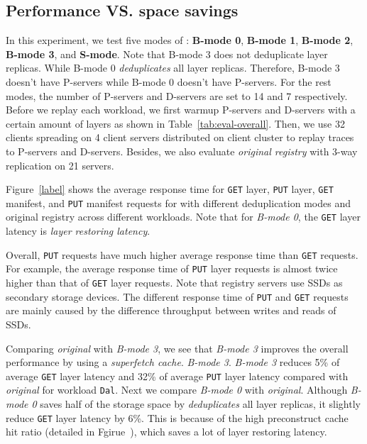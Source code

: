 

\subsection{Performance VS. space savings}
\label{sec:eval-dedup}


In this experiment,
we test five modes of \sysname:
\textbf{B-mode 0},
\textbf{B-mode 1},
\textbf{B-mode 2},
\textbf{B-mode 3}, and
\textbf{S-mode}.
Note that B-mode 3 does not deduplicate layer replicas.
While B-mode 0 \emph{deduplicates} all layer replicas. 
Therefore, B-mode 3 doesn't have P-servers while
B-mode 0 doesn't have P-servers.
For the rest modes,
the number of P-servers and D-servers are set to 14 and 7 respectively.
Before we replay each workload,
we first warmup P-servers and D-servers with a certain amount of layers as shown in Table~\ref{tab:eval-overall}.
Then,
we use 32 clients spreading on 4 client servers 
distributed on client cluster to replay traces to P-servers and D-servers.
Besides,
we also evaluate \emph{original registry} with 3-way replication on 21 servers. 

Figure~\ref{label} shows the average response time for 
\texttt{GET} layer, \texttt{PUT} layer, \texttt{GET} manifest, and \texttt{PUT} manifest
requests for \sysname with different deduplication modes and original registry across different workloads.
Note that for \emph{B-mode 0},
the \texttt{GET} layer latency is \emph{layer restoring latency}.

Overall, \texttt{PUT} requests have much higher average response time than \texttt{GET} requests.
For example, the average response time of 
\texttt{PUT} layer requests is almost twice higher than that of \texttt{GET} layer requests.
Note that registry servers use SSDs as secondary storage devices.
The different response time of \texttt{PUT} and \texttt{GET} requests are mainly caused by
the difference throughput between writes and reads of SSDs. 

Comparing \emph{original} with \emph{B-mode 3},
we see that \emph{B-mode 3} improves the overall performance by using a \emph{superfetch cache}.
\emph{B-mode 3}.
\emph{B-mode 3} reduces 5\% of average \texttt{GET} layer latency
and 32\% of average \texttt{PUT} layer latency compared with \emph{original} for workload \texttt{Dal}.
Next we compare \emph{B-mode 0} with \emph{original}.
Although \emph{B-mode 0} saves half of the storage space
by \emph{deduplicates} all layer replicas,
it slightly reduce \texttt{GET} layer latency by 6\%.
This is because of the high preconstruct cache hit ratio (detailed in Fgirue~\cite{xxx}), 
which saves a lot of layer restoring latency.

